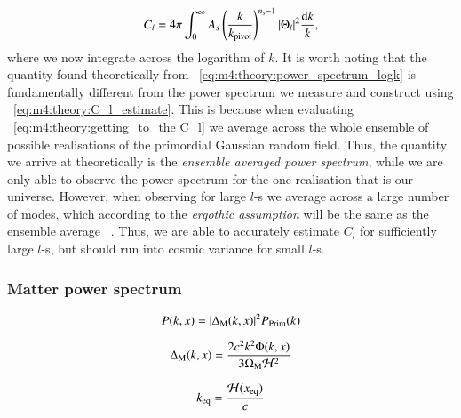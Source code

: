         \begin{equation}\label{eq:m4:theory:power_spectrum_logk}
            C_l = 4\pi\int_0^\infty A_s\left(\frac{k}{k_\mathrm{pivot}}\right)^{n_s-1}\abs{\Theta_l}^2\frac{\mathrm{d} k}{k},
        \end{equation}
        where we now integrate across the logarithm of $k$. It is worth noting that the quantity found theoretically from ~\cref{eq:m4:theory:power_spectrum_logk} is fundamentally different from the power spectrum we measure and construct using ~\cref{eq:m4:theory:C_l_estimate}. This is because when evaluating ~\cref{eq:m4:theory:getting_to_the C_l} we average across the whole ensemble of possible realisations of the primordial Gaussian random field. Thus, the quantity we arrive at theoretically is the \textit{ensemble averaged power spectrum}, while we are only able to observe the power spectrum for the one realisation that is our universe. However, when observing for large $l$-s we average across a large number of modes, which according to the \textit{ergothic assumption} will be the same as the ensemble average ~\cite{AST5220LectureNotes}. Thus, we are able to accurately estimate $C_l$ for sufficiently large $l$-s, but should run into cosmic variance for small $l$-s. 


    \subsubsection{Matter power spectrum}

    \begin{equation}\label{eq:m4:theory:matter_power_spectrum}
        P(k,x) = \abs{\Delta_\mathrm{M}(k,x)}^2P_\mathrm{Prim}(k)
    \end{equation}

    \begin{equation}
        \Delta_\mathrm{M}(k,x) = \frac{2c^2k^2\Phi(k,x)}{3\Omega_\mathrm{M}\mathcal{H}^2}
    \end{equation}

    \begin{equation}
        k_\mathrm{eq} = \frac{\mathcal{H}(x_\mathrm{eq})}{c}
    \end{equation}
